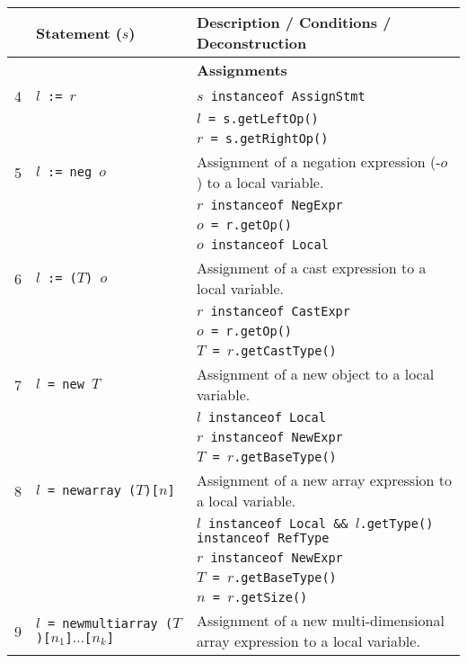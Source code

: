 \documentclass{article}
\begin{document}
\begin{scriptsize}
\begin{tabular}{lll}
\hline
& \textbf{Statement} ($s$)      & \textbf{Description / Conditions / Deconstruction}\\
\hline
\hline
&                & \textbf{Assignments}\\
4 & \texttt{$l$ := $r$}           & \texttt{$s$ instanceof AssignStmt}\\
&                & \texttt{$l$ = s.getLeftOp()}\\
&                & \texttt{$r$ = s.getRightOp()}\\
\hline
5 & \texttt{$l$ := neg $o$}           & Assignment of a negation expression (-$o$) to a local variable.\\
&                & \texttt{$r$ instanceof NegExpr}\\
&                & \texttt{$o$ = r.getOp()}\\
&                & \texttt{$o$ instanceof Local}\\
\hline
6 & \texttt{$l$ := ($T$) $o$}           & Assignment of a cast expression to a local variable.\\
&                & \texttt{$r$ instanceof CastExpr}\\
&                & \texttt{$o$ = r.getOp()}\\
&                & \texttt{$T$ = $r$.getCastType()}\\
\hline
7 & \texttt{$l$ = new $T$}           & Assignment of a new object to a local variable.\\
&                & \texttt{$l$ instanceof Local}\\
&                & \texttt{$r$ instanceof NewExpr}\\
&                & \texttt{$T$ = $r$.getBaseType()}\\
\hline
8 & \texttt{$l$ = newarray ($T$)[$n$]}           & Assignment of a new array expression to a local variable.\\
&                & \texttt{$l$ instanceof Local \&\& $l$.getType() instanceof RefType}\\
&                & \texttt{$r$ instanceof NewExpr}\\
&                & \texttt{$T$ = $r$.getBaseType()}\\
&                & \texttt{$n$ = $r$.getSize()}\\
\hline
9 & \texttt{$l$ = newmultiarray ($T$)[$n_1$]$\ldots$[$n_k$]}           & Assignment of a new multi-dimensional array expression to a local variable.\\

\end{tabular}
\end{scriptsize}
\end{document}
